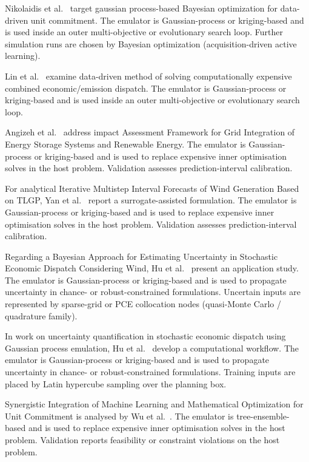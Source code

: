 Nikolaidis et al.~\cite{Nikolaidis2021} target gaussian process-based Bayesian optimization for data-driven unit commitment. The emulator is Gaussian-process or kriging-based and is used inside an outer multi-objective or evolutionary search loop. Further simulation runs are chosen by Bayesian optimization (acquisition-driven active learning).

Lin et al.~\cite{Lin2023} examine data-driven method of solving computationally expensive combined economic/emission dispatch. The emulator is Gaussian-process or kriging-based and is used inside an outer multi-objective or evolutionary search loop.

Angizeh et al.~\cite{Angizeh2023134995} address impact Assessment Framework for Grid Integration of Energy Storage Systems and Renewable Energy. The emulator is Gaussian-process or kriging-based and is used to replace expensive inner optimisation solves in the host problem. Validation assesses prediction-interval calibration.

For analytical Iterative Multistep Interval Forecasts of Wind Generation Based on TLGP, Yan et al.~\cite{Yan2019625} report a surrogate-assisted formulation. The emulator is Gaussian-process or kriging-based and is used to replace expensive inner optimisation solves in the host problem. Validation assesses prediction-interval calibration.

Regarding a Bayesian Approach for Estimating Uncertainty in Stochastic Economic Dispatch Considering Wind, Hu et al.~\cite{Hu2021671} present an application study. The emulator is Gaussian-process or kriging-based and is used to propagate uncertainty in chance- or robust-constrained formulations. Uncertain inputs are represented by sparse-grid or PCE collocation nodes (quasi-Monte Carlo / quadrature family).

In work on uncertainty quantification in stochastic economic dispatch using Gaussian process emulation, Hu et al.~\cite{Hu2020} develop a computational workflow. The emulator is Gaussian-process or kriging-based and is used to propagate uncertainty in chance- or robust-constrained formulations. Training inputs are placed by Latin hypercube sampling over the planning box.

Synergistic Integration of Machine Learning and Mathematical Optimization for Unit Commitment is analysed by Wu et al.~\cite{Wu2024391}. The emulator is tree-ensemble-based and is used to replace expensive inner optimisation solves in the host problem. Validation reports feasibility or constraint violations on the host problem.

